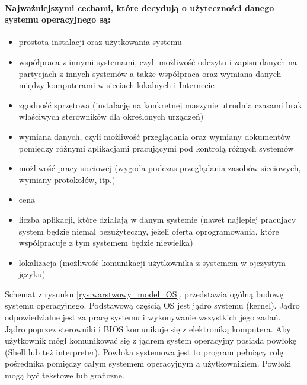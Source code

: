 \documentclass[a4paper,twoside]{report}
\begin{document}
\paragraph{Najważniejszymi cechami, które decydują o użyteczności danego systemu operacyjnego są:}
\begin{itemize}
\item prostota instalacji oraz użytkowania systemu
\item współpraca z innymi systemami, czyli możliwość odczytu i zapisu danych na partycjach z innych systemów a także współpraca oraz wymiana danych między komputerami w sieciach lokalnych i Internecie
\item zgodność sprzętowa (instalację na konkretnej maszynie utrudnia czasami brak właściwych sterowników dla określonych urządzeń)
\item wymiana danych, czyli możliwość przeglądania oraz wymiany dokumentów pomiędzy różnymi aplikacjami pracującymi pod kontrolą różnych systemów
\item możliwość pracy sieciowej (wygoda podczas przeglądania zasobów sieciowych, wymiany protokołów, itp.)
\item cena
\item liczba aplikacji, które działają w danym systemie (nawet najlepiej pracujący system będzie niemal bezużyteczny, jeżeli oferta oprogramowania, które współpracuje z tym systemem będzie niewielka)
\item lokalizacja (możliwość komunikacji użytkownika z systemem w ojczystym języku)
\end{itemize}

Schemat z rysunku \ref{rys:warstwowy_model_OS}. przedstawia ogólną budowę systemu operacyjnego. Podstawową częścią OS jest jądro systemu (kernel). Jądro odpowiedzialne jest za pracę systemu i wykonywanie wszystkich jego zadań. Jądro poprzez sterowniki i BIOS komunikuje się z elektroniką komputera. Aby użytkownik mógł komunikować się z jądrem system operacyjny posiada powłokę (Shell lub też interpreter). Powłoka systemowa jest to program pełniący rolę pośrednika pomiędzy całym systemem operacyjnym a użytkownikiem. Powłoki mogą być tekstowe lub graficzne.
\end{document}
